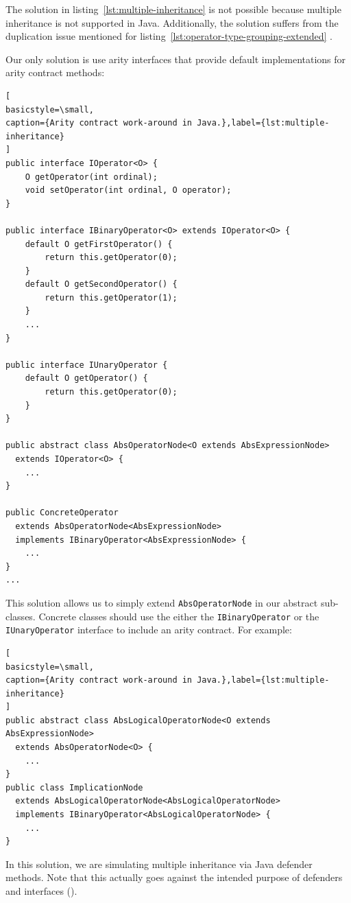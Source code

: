 \documentclass[12pt,oneside,a4paper,notitlepage]{report}
\begin{document}
	\par The solution in listing~\ref{lst:multiple-inheritance} is not possible because multiple inheritance is not supported in Java. Additionally, the solution suffers from the duplication issue mentioned for listing~\ref{lst:operator-type-grouping-extended} .

	\bigskip

	\newpage

	\par Our only solution is use arity interfaces that provide default implementations for arity contract methods:
	\begin{lstlisting}[
basicstyle=\small,
caption={Arity contract work-around in Java.},label={lst:multiple-inheritance}
]
public interface IOperator<O> {
	O getOperator(int ordinal);
	void setOperator(int ordinal, O operator);
}

public interface IBinaryOperator<O> extends IOperator<O> {
	default O getFirstOperator() {
		return this.getOperator(0);
	}
	default O getSecondOperator() {
		return this.getOperator(1);
	}
	...
}
	
public interface IUnaryOperator {
	default O getOperator() {
		return this.getOperator(0);
	}
}

public abstract class AbsOperatorNode<O extends AbsExpressionNode>
  extends IOperator<O> {
	...
}

public ConcreteOperator
  extends AbsOperatorNode<AbsExpressionNode>
  implements IBinaryOperator<AbsExpressionNode> {
	...
}
...
	\end{lstlisting}

	\newpage

	\par This solution allows us to simply extend \texttt{AbsOperatorNode} in our abstract sub-classes. Concrete classes should use the either the \texttt{IBinaryOperator} or the \texttt{IUnaryOperator} interface to include an arity contract. For example:
	\begin{lstlisting}[
basicstyle=\small,
caption={Arity contract work-around in Java.},label={lst:multiple-inheritance}
]
public abstract class AbsLogicalOperatorNode<O extends AbsExpressionNode>
  extends AbsOperatorNode<O> {
	...
}
public class ImplicationNode
  extends AbsLogicalOperatorNode<AbsLogicalOperatorNode>
  implements IBinaryOperator<AbsLogicalOperatorNode> {
	...
}
	\end{lstlisting}

	\par In this solution, we are simulating multiple inheritance via Java defender methods. Note that this actually goes against the intended purpose of defenders and interfaces (\cite{defaultmethodslink}).
\end{document}
